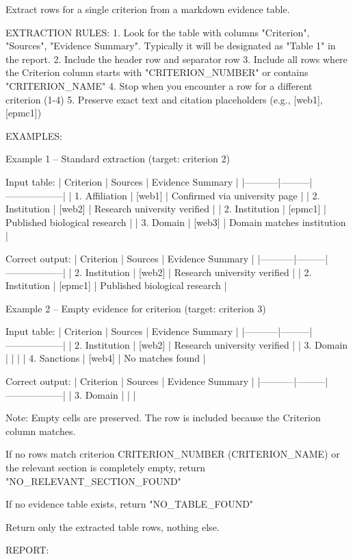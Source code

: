 \documentclass[utf8]{frontiers_suppmat}
\begin{document}
\begin{promptlisting}
Extract rows for a single criterion from a markdown evidence table.

EXTRACTION RULES:
1. Look for the table with columns "Criterion", "Sources",
   "Evidence Summary". Typically it will be designated as
   "Table 1" in the report.
2. Include the header row and separator row
3. Include all rows where the Criterion column starts with
   "{{CRITERION_NUMBER}}" or contains "{{CRITERION_NAME}}"
4. Stop when you encounter a row for a different criterion (1-4)
5. Preserve exact text and citation placeholders (e.g., [web1],
   [epmc1])

EXAMPLES:

Example 1 -- Standard extraction (target: criterion 2)

Input table:
| Criterion | Sources | Evidence Summary |
|-----------|---------|------------------|
| 1. Affiliation | [web1] | Confirmed via university page |
| 2. Institution | [web2] | Research university verified |
| 2. Institution | [epmc1] | Published biological research |
| 3. Domain | [web3] | Domain matches institution |

Correct output:
| Criterion | Sources | Evidence Summary |
|-----------|---------|------------------|
| 2. Institution | [web2] | Research university verified |
| 2. Institution | [epmc1] | Published biological research |

Example 2 -- Empty evidence for criterion (target: criterion 3)

Input table:
| Criterion | Sources | Evidence Summary |
|-----------|---------|------------------|
| 2. Institution | [web2] | Research university verified |
| 3. Domain | | |
| 4. Sanctions | [web4] | No matches found |

Correct output:
| Criterion | Sources | Evidence Summary |
|-----------|---------|------------------|
| 3. Domain | | |

Note: Empty cells are preserved. The row is included because the
Criterion column matches.

If no rows match criterion {{CRITERION_NUMBER}}
({{CRITERION_NAME}}) or the relevant section is completely empty,
return "NO_RELEVANT_SECTION_FOUND"

If no evidence table exists, return "NO_TABLE_FOUND"

Return only the extracted table rows, nothing else.

REPORT:
\end{promptlisting}
\end{document}
